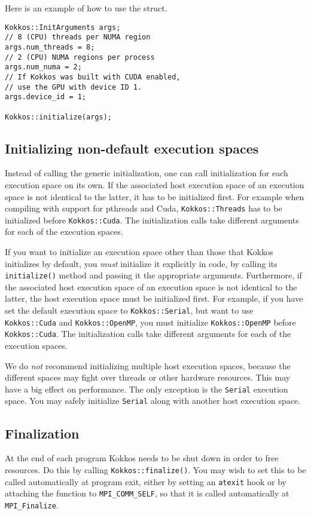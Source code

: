 Here is an example of how to use the struct.
\begin{lstlisting}
Kokkos::InitArguments args;
// 8 (CPU) threads per NUMA region
args.num_threads = 8;
// 2 (CPU) NUMA regions per process
args.num_numa = 2;
// If Kokkos was built with CUDA enabled,
// use the GPU with device ID 1.
args.device_id = 1;

Kokkos::initialize(args);
\end{lstlisting}

\subsection{Initializing non-default execution spaces}\label{S:init:specific}

Instead of calling the generic initialization, one can call initialization for each execution space on its own. 
If the associated host execution space of an execution space is not identical to the latter, it has to be initialized first.
For example when compiling with support for pthreads and Cuda, \lstinline|Kokkos::Threads| has to be initialized before \lstinline|Kokkos::Cuda|.
The initialization calls take different arguments for each of the execution spaces.

If you want to initialize an execution space other than those that Kokkos initializes by default,
you \emph{must} initialize it explicitly in code, by calling its \lstinline!initialize()! method and passing it the appropriate arguments.
Furthermore, if the associated host execution space of an execution space is not identical to the latter, the host execution space must be initialized first.
For example, if you have set the default execution space to \lstinline!Kokkos::Serial!, 
but want to use \lstinline!Kokkos::Cuda! and \lstinline!Kokkos::OpenMP!, 
you must initialize \lstinline!Kokkos::OpenMP! before \lstinline!Kokkos::Cuda!.
The initialization calls take different arguments for each of the execution spaces.

We do \emph{not} recommend initializing multiple host execution spaces,
because the different spaces may fight over threads or other hardware resources.
This may have a big effect on performance.
The only exception is the \lstinline!Serial! execution space.
You may safely initialize \lstinline!Serial! along with another host execution space.

\subsection{Finalization}\label{S:init:finalize}

At the end of each program Kokkos needs to be shut down in order to free resources. 
Do this by calling \lstinline!Kokkos::finalize()!.
You may wish to set this to be called automatically at program exit,
either by setting an \lstinline!atexit! hook
or by attaching the function to \lstinline!MPI_COMM_SELF!,
so that it is called automatically at \lstinline!MPI_Finalize!.

